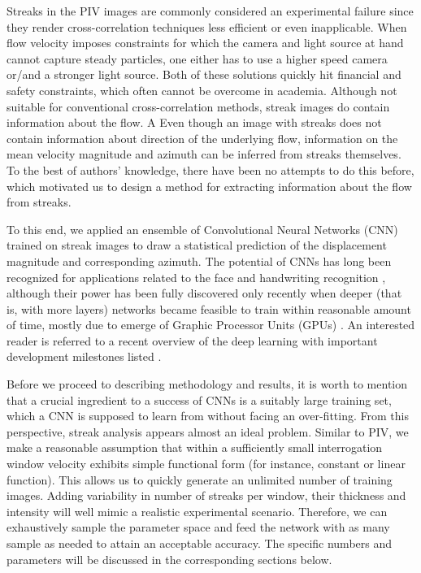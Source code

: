 \documentclass{svjour3}                     %
\begin{document}
Streaks in the PIV images are commonly considered an experimental failure since they render cross-correlation techniques less efficient or even inapplicable. When flow velocity imposes constraints for which the camera and light source at hand cannot capture steady particles, one either has to use a higher speed camera or/and a stronger light source. Both of these solutions quickly hit financial and safety constraints, which often cannot be overcome in academia. Although not suitable for conventional cross-correlation methods, streak images do contain information about the flow. A Even though an image with streaks does not contain information about direction of the underlying flow, information on the mean velocity magnitude and azimuth can be inferred from streaks themselves. To the best of authors' knowledge, there have been no attempts to do this before, which motivated us to design a method for extracting information about the flow from streaks. 

To this end, we applied an ensemble of Convolutional Neural Networks (CNN) trained on streak images to draw a statistical prediction of the displacement magnitude and corresponding azimuth. The potential of CNNs has long been recognized for applications related to the face and handwriting recognition \cite{lawrence1997face, simard2003best}, although their power has been fully discovered only recently when deeper (that is, with more layers) networks became feasible to train within reasonable amount of time, mostly due to emerge of Graphic Processor Units (GPUs) \cite{krizhevsky2012imagenet, karpathy2014large}. An interested reader is referred to a recent overview of the deep learning with important development milestones listed \cite{lecun2015deep}.

Before we proceed to describing methodology and results, it is worth to mention that a crucial ingredient to a success of CNNs is a suitably large training set, which a CNN is supposed to learn from without facing an over-fitting. From this perspective, streak analysis appears almost an ideal problem. Similar to PIV, we make a reasonable assumption that within a sufficiently small interrogation window velocity exhibits simple functional form (for instance, constant or linear function). This allows us to quickly generate an unlimited number of training images. Adding variability in number of streaks per window, their thickness and intensity will well mimic a realistic experimental scenario. Therefore, we can exhaustively sample the parameter space and feed the network with as many sample as needed to attain an acceptable accuracy. The specific numbers and parameters will be discussed in the corresponding sections below.
\end{document}

